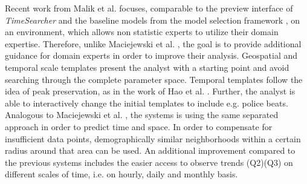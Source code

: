 \documentclass[electronic]{vgtc}             %
\begin{document}
Recent work from Malik et al. \cite{malik:2014} focuses, comparable to the preview interface of \textit{TimeSearcher} \cite{buono:2005} and the baseline models from the model selection framework \cite{lu:2014}, on an environment, which allows non statistic experts to utilize their domain expertise.
Therefore, unlike Maciejewski et al. \cite{maciejewski:2011}, the goal is to provide additional guidance for domain experts in order to improve their analysis.
Geospatial and temporal scale templates present the analyst with a starting point and avoid searching through the complete parameter space.
Temporal templates follow the idea of peak preservation, as in the work of Hao et al. \cite{Hao:2012}.
Further, the analyst is able to interactively change the initial templates to include e.g. police beats.
Analogous to Maciejewski et al. \cite{maciejewski:2011, maciejewski:2010}, the systems is using the same separated approach in order to predict time and space.
In order to compensate for insufficient data points, demographically similar neighborhoods within a certain radius around that area can be used. 
An additional improvement compared to the previous systems includes the easier access to observe trends (Q2)(Q3) on different scales of time, i.e. on hourly, daily and monthly basis.
\end{document}
